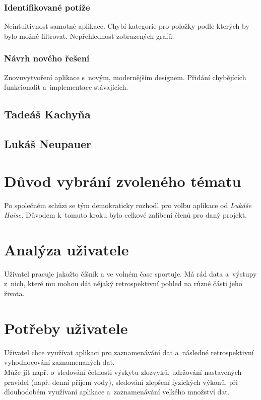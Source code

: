 \documentclass[12pt, titlepage]{article}
\begin{document}
\subsubsection{Identifikované potíže}
Neintuitivnost samotné aplikace. Chybí kategorie pro položky podle kterých by bylo možné filtrovat. Nepřehlednost zobrazených grafů.
\subsubsection{Návrh nového řešení}
Znovuvytvoření aplikace s~novým, modernějším designem. Přidání chybějících funkcionalit a~implementace stávajících.

\subsection{Tadeáš Kachyňa}
\subsection{Lukáš Neupauer}



\newpage



\section{Důvod vybrání zvoleného tématu}
Po společném schůzi se tým demokraticky rozhodl pro volbu aplikace od \emph{Lukáše Haise.} Důvodem k~tomuto kroku bylo celkové zalíbení členů pro daný projekt.

\section{Analýza uživatele}
Uživatel pracuje jakožto číšník a ve volném čase sportuje. Má rád data a~výstupy z~nich, které mu mohou dát nějaký retrospektivní pohled na různé části jeho života. 

\section{Potřeby uživatele}
Uživatel chce využívat aplikaci pro zaznamenávání dat a~následné retrospektivní vyhodnocování zaznamenaných dat.\\
Může jít např. o~sledování četnosti výskytu zlozvyků, udržování nastavených pravidel (např. denní příjem vody), sledování zlepšení fyzických výkonů,  při dlouhodobém využívaní aplikace a~zaznamenávání velkého množství dat.
\end{document}
